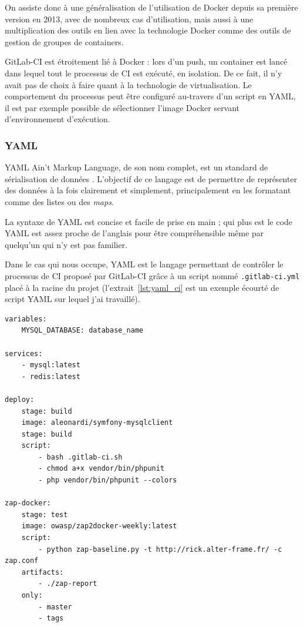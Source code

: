 On assiste donc à une généralisation de l'utilisation de Docker depuis sa première version en 2013, avec de nombreux cas d'utilisation\cite{docker_use_cases}, mais aussi à une multiplication des outils en lien avec la technologie Docker comme des outils de gestion de groupes de containers\cite{kubernetes}\cite{swarm}.

GitLab-CI est étroitement lié à Docker : lors d'un push, un container est lancé dans lequel tout le processus de CI est exécuté, en isolation. De ce fait, il n'y avait pas de choix à faire quant à la technologie de virtualisation. Le comportement du processus peut être configuré au-travers d'un script en YAML, il est par exemple possible de sélectionner l'image Docker servant d'environnement d'exécution.

\subsubsection{YAML}
YAML Ain't Markup Language\cite{yaml}, de son nom complet, est un \og standard de sérialisation de données \fg{}. L'objectif de ce langage est de permettre de représenter des données à la fois clairement et simplement, principalement en les formatant comme des listes ou des \textit{maps}.

La syntaxe de YAML est concise et facile de prise en main\cite{yaml_refcard} ; qui plus est le code YAML est assez proche de l'anglais pour être compréhensible même par quelqu'un qui n'y est pas familier.

Dans le cas qui nous occupe, YAML est le langage permettant de contrôler le processus de CI proposé par GitLab-CI grâce à un script nommé \verb|.gitlab-ci.yml| placé à la racine du projet (l'extrait~\ref{lst:yaml_ci} est un exemple écourté de script YAML sur lequel j'ai travaillé).

\begin{minipage}{\linewidth}
	\begin{lstlisting}[caption={Script de contrôle de processus de CI en YAML},label={lst:yaml_ci}]
variables:
    MYSQL_DATABASE: database_name

services:
    - mysql:latest
    - redis:latest

deploy:
    stage: build
    image: aleonardi/symfony-mysqlclient
    stage: build
    script:
        - bash .gitlab-ci.sh
        - chmod a+x vendor/bin/phpunit
        - php vendor/bin/phpunit --colors

zap-docker:
    stage: test
    image: owasp/zap2docker-weekly:latest
    script:
        - python zap-baseline.py -t http://rick.alter-frame.fr/ -c zap.conf
    artifacts:
        - ./zap-report
    only:
        - master
        - tags
    \end{lstlisting}
\end{minipage}

